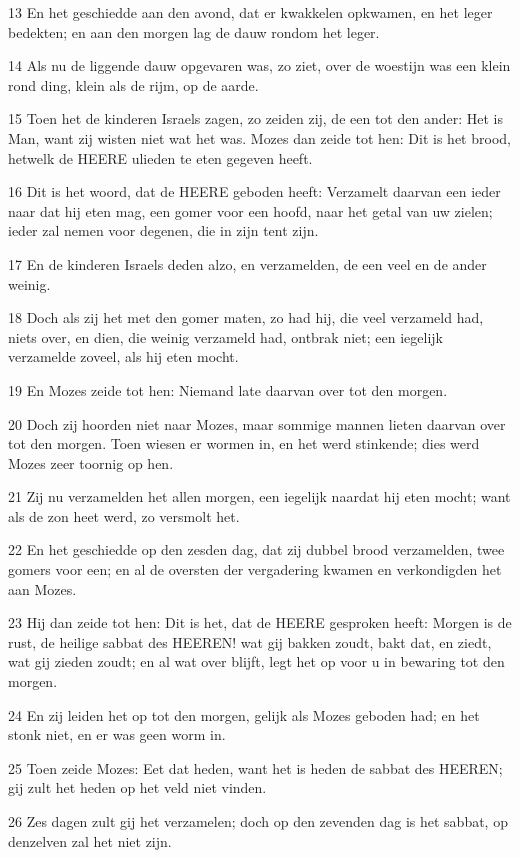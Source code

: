 \par 13 En het geschiedde aan den avond, dat er kwakkelen opkwamen, en het leger bedekten; en aan den morgen lag de dauw rondom het leger.
\par 14 Als nu de liggende dauw opgevaren was, zo ziet, over de woestijn was een klein rond ding, klein als de rijm, op de aarde.
\par 15 Toen het de kinderen Israels zagen, zo zeiden zij, de een tot den ander: Het is Man, want zij wisten niet wat het was. Mozes dan zeide tot hen: Dit is het brood, hetwelk de HEERE ulieden te eten gegeven heeft.
\par 16 Dit is het woord, dat de HEERE geboden heeft: Verzamelt daarvan een ieder naar dat hij eten mag, een gomer voor een hoofd, naar het getal van uw zielen; ieder zal nemen voor degenen, die in zijn tent zijn.
\par 17 En de kinderen Israels deden alzo, en verzamelden, de een veel en de ander weinig.
\par 18 Doch als zij het met den gomer maten, zo had hij, die veel verzameld had, niets over, en dien, die weinig verzameld had, ontbrak niet; een iegelijk verzamelde zoveel, als hij eten mocht.
\par 19 En Mozes zeide tot hen: Niemand late daarvan over tot den morgen.
\par 20 Doch zij hoorden niet naar Mozes, maar sommige mannen lieten daarvan over tot den morgen. Toen wiesen er wormen in, en het werd stinkende; dies werd Mozes zeer toornig op hen.
\par 21 Zij nu verzamelden het allen morgen, een iegelijk naardat hij eten mocht; want als de zon heet werd, zo versmolt het.
\par 22 En het geschiedde op den zesden dag, dat zij dubbel brood verzamelden, twee gomers voor een; en al de oversten der vergadering kwamen en verkondigden het aan Mozes.
\par 23 Hij dan zeide tot hen: Dit is het, dat de HEERE gesproken heeft: Morgen is de rust, de heilige sabbat des HEEREN! wat gij bakken zoudt, bakt dat, en ziedt, wat gij zieden zoudt; en al wat over blijft, legt het op voor u in bewaring tot den morgen.
\par 24 En zij leiden het op tot den morgen, gelijk als Mozes geboden had; en het stonk niet, en er was geen worm in.
\par 25 Toen zeide Mozes: Eet dat heden, want het is heden de sabbat des HEEREN; gij zult het heden op het veld niet vinden.
\par 26 Zes dagen zult gij het verzamelen; doch op den zevenden dag is het sabbat, op denzelven zal het niet zijn.
